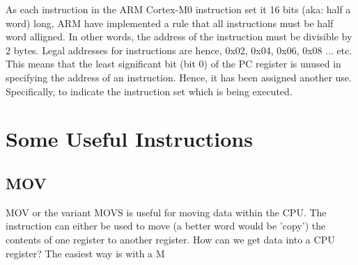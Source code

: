 As each instruction in the ARM Cortex-M0 instruction set it 16 bits (aka: half a word) long, ARM have implemented a rule that all instructions must be half word alligned. In other words, the address of the instruction must be divisible by 2 bytes. Legal addresses for instructions are hence, 0x02, 0x04, 0x06, 0x08 ... etc. 
This means that the least significant bit (bit 0) of the PC register is unused in specifying the address of an instruction. 
Hence, it has been assigned another use. Specifically, to indicate the instruction set which is being executed. 

\section{Some Useful Instructions}
\subsection{MOV}
MOV or the variant MOVS is useful for moving data within the CPU. The instruction can either be used to move (a better word would be 'copy') the contents of one register to another register. 
How can we get data into a CPU register? The easiest way is with a M

